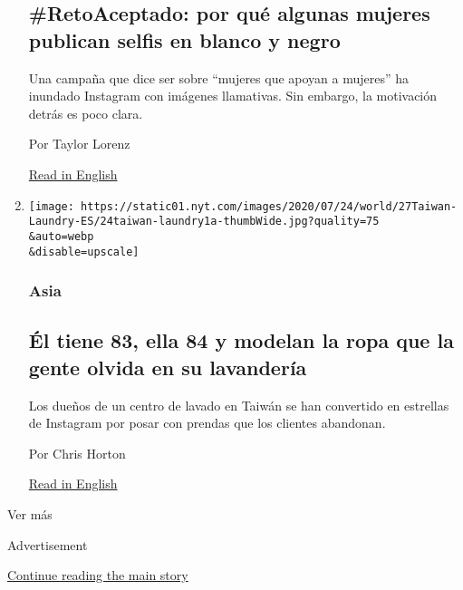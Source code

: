 \begin{enumerate}
  \hypertarget{retoaceptado-por-quuxe9-algunas-mujeres-publican-selfis-en-blanco-y-negro}{%
  \subsection{\#RetoAceptado: por qué algunas mujeres publican selfis en
  blanco y
  negro}\label{retoaceptado-por-quuxe9-algunas-mujeres-publican-selfis-en-blanco-y-negro}}

  Una campaña que dice ser sobre ``mujeres que apoyan a mujeres'' ha
  inundado Instagram con imágenes llamativas. Sin embargo, la motivación
  detrás es poco clara.

  Por Taylor Lorenz

  \href{https://www.nytimes.com/2020/07/27/style/challenge-accepted-instagram.html}{Read
  in English}
\item
  \href{/es/2020/07/28/espanol/mundo/lavanderia-taiwanesa-instagram.html}{}

  \texttt{[image: https://static01.nyt.com/images/2020/07/24/world/27Taiwan-Laundry-ES/24taiwan-laundry1a-thumbWide.jpg?quality=75\\\&auto=webp\\\&disable=upscale]}

  \hypertarget{asia}{%
  \subsubsection{Asia}\label{asia}}

  \hypertarget{uxe9l-tiene-83-ella-84-y-modelan-la-ropa-que-la-gente-olvida-en-su-lavanderuxeda}{%
  \subsection{Él tiene 83, ella 84 y modelan la ropa que la gente olvida
  en su
  lavandería}\label{uxe9l-tiene-83-ella-84-y-modelan-la-ropa-que-la-gente-olvida-en-su-lavanderuxeda}}

  Los dueños de un centro de lavado en Taiwán se han convertido en
  estrellas de Instagram por posar con prendas que los clientes
  abandonan.

  Por Chris Horton

  \href{https://www.nytimes.com/2020/07/24/world/asia/taiwan-octogenarian-couple-instagram-laundry.html}{Read
  in English}
\end{enumerate}

Ver más

Advertisement

\protect\hyperlink{after-mid2}{Continue reading the main story}

